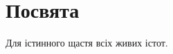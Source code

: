 \begin{figure}[ht!]
\section*{Посвята}
Для істинного щастя всіх живих істот.
\\
\\
\\

\end{figure}
